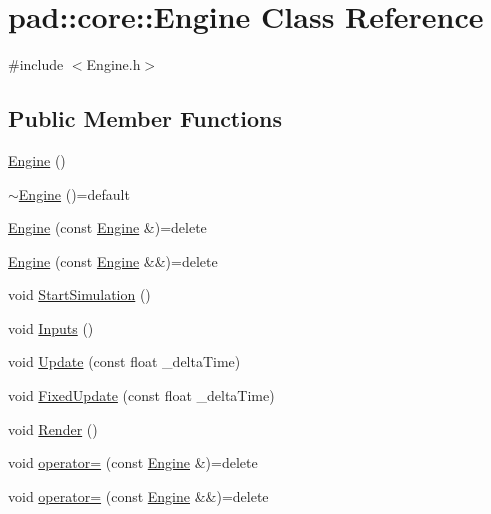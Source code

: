 \hypertarget{classpad_1_1core_1_1_engine}{}\section{pad\+:\+:core\+:\+:Engine Class Reference}
\label{classpad_1_1core_1_1_engine}


{\ttfamily \#include $<$Engine.\+h$>$}

\subsection*{Public Member Functions}
\begin{DoxyCompactItemize}
\item 
\mbox{\hyperlink{classpad_1_1core_1_1_engine_a21cbbda47294efd9577f2326e296987d}{Engine}} ()
\item 
\mbox{\hyperlink{classpad_1_1core_1_1_engine_adf8454fe3270311518b0b5755efceaec}{$\sim$\+Engine}} ()=default
\item 
\mbox{\hyperlink{classpad_1_1core_1_1_engine_a7f3a2054a58b7c517b6344e4f7d3caa1}{Engine}} (const \mbox{\hyperlink{classpad_1_1core_1_1_engine}{Engine}} \&)=delete
\item 
\mbox{\hyperlink{classpad_1_1core_1_1_engine_aba083d4c42ed225c5d4c7fdc01aa6304}{Engine}} (const \mbox{\hyperlink{classpad_1_1core_1_1_engine}{Engine}} \&\&)=delete
\item 
void \mbox{\hyperlink{classpad_1_1core_1_1_engine_a02dfcdfa4826c9ae9ee18d16d22c0e33}{Start\+Simulation}} ()
\item 
void \mbox{\hyperlink{classpad_1_1core_1_1_engine_ae51ab583e2510e51838ac6b3473c4043}{Inputs}} ()
\item 
void \mbox{\hyperlink{classpad_1_1core_1_1_engine_a6d450c23f74f2a7264406fe607e0a6fa}{Update}} (const float \+\_\+delta\+Time)
\item 
void \mbox{\hyperlink{classpad_1_1core_1_1_engine_a58d9a7f1516b4286d11c6048b712c6ed}{Fixed\+Update}} (const float \+\_\+delta\+Time)
\item 
void \mbox{\hyperlink{classpad_1_1core_1_1_engine_a6fb2ea7ace95d697e53d336eed279ace}{Render}} ()
\item 
void \mbox{\hyperlink{classpad_1_1core_1_1_engine_aa97a489c1f1212d3e58f66ce1a49fb48}{operator=}} (const \mbox{\hyperlink{classpad_1_1core_1_1_engine}{Engine}} \&)=delete
\item 
void \mbox{\hyperlink{classpad_1_1core_1_1_engine_a410aa3ba5bd595d7831a41e9dc4470fa}{operator=}} (const \mbox{\hyperlink{classpad_1_1core_1_1_engine}{Engine}} \&\&)=delete
\end{DoxyCompactItemize}


